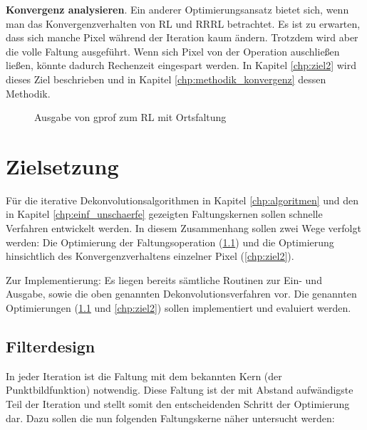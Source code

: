 \documentclass[a4paper,12pt]{article}
\begin{document}
\textbf{Konvergenz analysieren}.
Ein anderer Optimierungsansatz bietet sich, wenn man das Konvergenzverhalten von
RL und RRRL betrachtet. Es ist zu erwarten, dass sich manche Pixel während der
Iteration kaum ändern. Trotzdem wird aber die volle Faltung ausgeführt. Wenn
sich Pixel von der Operation auschließen ließen, könnte dadurch Rechenzeit
eingespart werden. In Kapitel \ref{chp:ziel2} wird dieses Ziel beschrieben und
in Kapitel \ref{chp:methodik_konvergenz} dessen Methodik.


\begin{figure}[htbp]
\caption{Ausgabe von gprof zum RL mit Ortsfaltung}%
\label{figure_gprof}
\end{figure}
 

\section{Zielsetzung}
Für die iterative Dekonvolutionsalgorithmen in Kapitel \ref{chp:algoritmen} und
den in Kapitel \ref{chp:einf_unschaerfe} gezeigten Faltungskernen sollen
schnelle Verfahren entwickelt werden. In diesem Zusammenhang sollen zwei Wege
verfolgt werden: Die Optimierung der Faltungsoperation (\ref{chp:ziel1})
und die Optimierung hinsichtlich des Konvergenzverhaltens einzelner Pixel
(\ref{chp:ziel2}).

Zur Implementierung: Es liegen bereits sämtliche Routinen zur Ein- und
Ausgabe, sowie die oben genannten Dekonvolutionsverfahren vor. 
Die genannten Optimierungen (\ref{chp:ziel1} und \ref{chp:ziel2}) sollen implementiert
und evaluiert werden.

\subsection{Filterdesign} \label{chp:ziel1}

In jeder Iteration ist die Faltung mit dem bekannten Kern (der
Punktbildfunktion) notwendig. Diese Faltung ist der mit Abstand aufwändigste Teil 
der Iteration und stellt somit den entscheidenden Schritt der Optimierung
dar. Dazu sollen die nun folgenden Faltungskerne näher untersucht werden:
\end{document}
